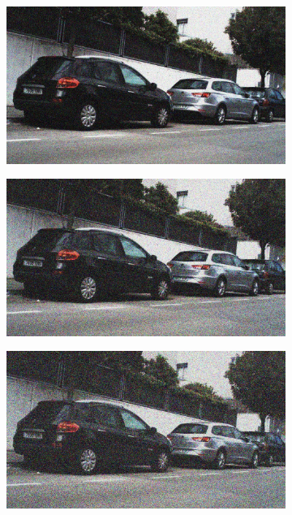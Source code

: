 \documentclass[a4paper]{ctexart}
\begin{document}
\begin{figure}[htbp]
\begin{subfigure}{0.08\textwidth}
				\label{fig：Gamma=0.4, Gauss Noise = 0.1}
			\end{subfigure}
			\begin{subfigure}{0.08\textwidth}
				\captionsetup{font=scriptsize}
				\includegraphics[width=\linewidth]{picture/Edge Detection/degrade/RGB_001 Gamma=0.4, Gauss Noise=0.2}
				\label{fig：Gamma=0.4, Gauss Noise = 0.2}
			\end{subfigure}
			\begin{subfigure}{0.08\textwidth}
				\captionsetup{font=scriptsize}
				\includegraphics[width=\linewidth]{picture/Edge Detection/degrade/RGB_001 Gamma=0.4, Gauss Noise=0.3}
				\label{fig：Gamma=0.4, Gauss Noise = 0.3}
			\end{subfigure}
			\begin{subfigure}{0.08\textwidth}
				\captionsetup{font=scriptsize}
				\includegraphics[width=\linewidth]{picture/Edge Detection/degrade/RGB_001 Gamma=0.4, Gauss Noise=0.4}

\end{subfigure}
\end{figure}
\end{document}
